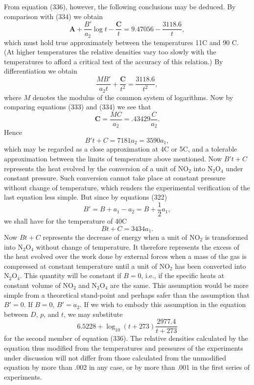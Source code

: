 \documentclass[12pt]{memoir}
\begin{document}
From equation (336), however, the following conclusions may be
deduced. By comparison with (334) we obtain
$$ \mathbf{A} +\frac{B'}{a_2} \log t  -\frac{\mathbf{C}}{t}=  9.47056- \frac{3118.6}{t}, $$
which must hold true approximately between the temperatures 11\degree C and 90 \degree C. (At higher temperatures the relative densities vary too slowly with the temperatures to afford a critical test of the accuracy of this relation.) By differentiation we obtain
$$\frac{MB'}{a_2 t} +\frac{\mathbf{C}}{t^2} = \frac{3118.6}{t^2}, $$
where $M$ denotes the modulus of the common system of logarithms. Now by comparing equations (333) and (334) we see that
$$\mathbf{C} = \frac{MC}{a_2} = .43429 \frac{C}{a_2}.$$
Hence
$$  B't + C= 7181 a_2= 3590a_1,$$
which may be regarded as a close approximation at 4\degree C or 5\degree C, and a tolerable approximation between the limits of temperature above mentioned.  Now $B't+C$ represents the heat evolved by the conversion of a unit of NO$_2$ into N$_2$O$_4$ under constant pressure. Such conversion cannot take place at constant pressure without change of temperature, which renders the experimental verification of the last equation less simple. But since by equations (322)
$$B' =B+a_1-a_2=B+ \frac{1}{2}a_1,$$
we shall have for the temperature of 40\degree C
$$Bt + C= 3434a_1.$$
Now $Bt+ C$ represents the decrease of energy when a unit of NO$_2$ is transformed into N$_2$O$_4$ without change of temperature. It therefore represents the excess of the heat evolved over the work done by external forces when a mass of the gas is compressed at constant temperature until a unit of NO$_2$ has been converted into N$_2$O$_4$. This quantity will be constant if $B=0$, i.e., if the specific heats at constant volume of NO$_2$ and N$_2$O$_4$ are the same. This assumption would be more simple from a theoretical stand-point and perhaps safer than the assumption that $B'=0$. If $B=0$, $B'=a_2$. If we wish to embody this assumption in the equation between $D$, $p$, and $t$, we may substitute
$$6.5228 + \log_{10}(t + 273) \frac{ 2977.4}{t + 273}$$
for the second member of equation (336).  The relative densities calculated by the equation thus modified from the temperatures and pressures of the experiments under discussion will not differ from those calculated from the unmodified equation by more than .002 in any case, or by more than .001 in the first series of experiments.
\end{document}
